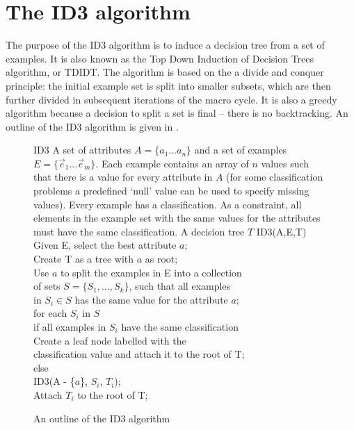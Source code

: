 \documentclass[twoside,11pt]{article}
\begin{document}


\section{The ID3 algorithm}
\label{sec:id3}
The purpose of the ID3 algorithm \cite{quinlan:trees} is to induce a decision tree from a set of examples.  It is also known as the Top Down Induction of Decision Trees algorithm, or TDIDT. The algorithm is based on the a divide and conquer principle: the initial example set is split into smaller subsets, which are then further divided in subsequent iterations of the macro cycle. It is also a greedy algorithm because a decision to split a set is final -- there is no backtracking.  An outline of the ID3 algorithm is given in .
\begin{figure}[h!]
\begin{algorithm}
{ID3}
{A set of attributes $A = \{ a_1 \ldots a_n\}$ and a set of examples $E = \{\vec e_1 \ldots \vec e_m\}$.  Each example contains an array of $n$ values such that there is a value for every attribute in $A$ (for some classification problems a predefined `null' value can be used to specify missing values).  Every example has a classification. As a constraint, all elements in the example set with the same values for the attributes must have the same classification.}
{A decision tree $T$} 
ID3(A,E,T) \+\\
Given E, select the best attribute $a$; \label{line:id3_select} \\
Create T as a tree with $a$ as root; \\
Use $a$ to split the examples in E  into a collection  \+ \\
	of sets $S = \{S_1, \ldots, S_k\}$, such that all examples \\
	 in $S_i \in S$ has the same value for the attribute $a$; \- \\ 
for each $S_i$ in $S$ \+ \\
	if all examples in $S_i$ have the same classification \+ \\
			Create a leaf node labelled with the  \+ \\ 
			classification value and attach it
			to the root of T; \- \-\\ 
	else \+ \\ 
			ID3(A - \{$a$\}, $S_i$, $T_i$); \\
			Attach $T_i$ to the root of T;
\end{algorithm}
\caption{An outline of the ID3 algorithm}
\label{alg:id3}	
\end{figure}
\end{document}
